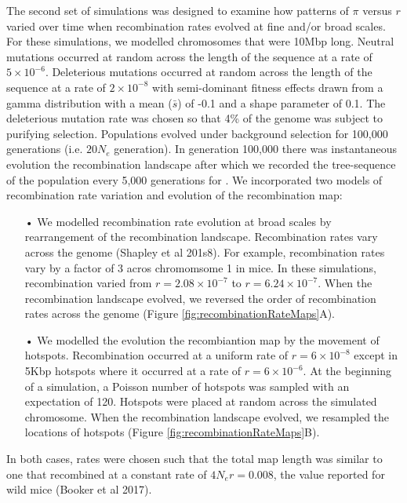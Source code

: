 \documentclass[11pt,twoside, onecolumn]{GSA_format}
\begin{document}
The second set of simulations was designed to examine how patterns of $\pi$ versus $r$ varied over time when recombination rates evolved at fine and/or broad scales. For these simulations, we modelled chromosomes that were 10Mbp long. Neutral mutations occurred at random across the length of the sequence at a rate of $5\times10^{-6}$. Deleterious mutations occurred at random across the length of the sequence at a rate of $2\times10^{-8}$ with semi-dominant fitness effects drawn from a gamma distribution with a mean ($\bar{s}$) of -0.1 and a shape parameter of 0.1. The deleterious mutation rate was chosen so that 4\% of the genome was subject to purifying selection. Populations evolved under background selection for 100,000 generations (i.e. $20N_e$ generation). In generation 100,000 there was instantaneous evolution the recombination landscape after which we recorded the tree-sequence of the population every 5,000 generations for . We incorporated two models of recombination rate variation and evolution of the recombination map:
\begin{itemize}

\item[•] We modelled recombination rate evolution at broad scales by rearrangement of the recombination landscape. Recombination rates vary across the genome (Shapley et al 201s8). For example, recombination rates vary by a factor of 3 acros chromomsome 1 in mice. In these simulations, recombination varied from $r=2.08\times10^{-7}$ to $r=6.24\times10^{-7}$. When the recombination landscape evolved, we reversed the order of recombination rates across the genome (Figure \ref{fig:recombinationRateMaps}A).

\item[•] We modelled the evolution the recombiantion map by the movement of hotspots. Recombination occurred at a uniform rate of $r=6\times10^{-8}$ except in 5Kbp hotspots where it occurred at a rate of $r=6\times10^{-6}$. At the beginning of a simulation, a Poisson number of hotspots was sampled with an expectation of 120. Hotspots were placed at random across the simulated chromosome. When the recombination landscape evolved, we resampled the locations of hotspots (Figure \ref{fig:recombinationRateMaps}B).

\end{itemize}

\noindent In both cases, rates were chosen such that the total map length was similar to one that recombined at a constant rate of $4N_er=0.008$, the value reported for wild mice (Booker et al 2017). \\
\end{document}
